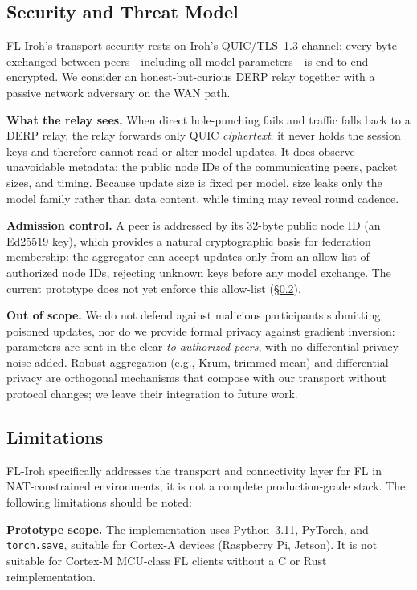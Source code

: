 ﻿\documentclass[journal]{IEEEtran}
\begin{document}
\subsection{Security and Threat Model}
\label{sec:threat}

FL-Iroh's transport security rests on Iroh's QUIC/TLS~1.3 channel: every byte exchanged between peers---including all model parameters---is end-to-end encrypted. We consider an honest-but-curious DERP relay together with a passive network adversary on the WAN path.

\textbf{What the relay sees.} When direct hole-punching fails and traffic falls back to a DERP relay, the relay forwards only QUIC \emph{ciphertext}; it never holds the session keys and therefore cannot read or alter model updates. It does observe unavoidable metadata: the public node IDs of the communicating peers, packet sizes, and timing. Because update size is fixed per model, size leaks only the model family rather than data content, while timing may reveal round cadence.

\textbf{Admission control.} A peer is addressed by its 32-byte public node ID (an Ed25519 key), which provides a natural cryptographic basis for federation membership: the aggregator can accept updates only from an allow-list of authorized node IDs, rejecting unknown keys before any model exchange. The current prototype does not yet enforce this allow-list (\S\ref{sec:limitations}).

\textbf{Out of scope.} We do not defend against malicious participants submitting poisoned updates, nor do we provide formal privacy against gradient inversion: parameters are sent in the clear \emph{to authorized peers}, with no differential-privacy noise added. Robust aggregation (e.g., Krum, trimmed mean) and differential privacy are orthogonal mechanisms that compose with our transport without protocol changes; we leave their integration to future work.

\subsection{Limitations}
\label{sec:limitations}

FL-Iroh specifically addresses the transport and connectivity layer for FL in NAT-constrained environments; it is not a complete production-grade stack. The following limitations should be noted:

\textbf{Prototype scope.} The implementation uses Python~3.11, PyTorch, and \texttt{torch.save}, suitable for Cortex-A devices (Raspberry Pi, Jetson). It is not suitable for Cortex-M MCU-class FL clients without a C or Rust reimplementation.
\end{document}
